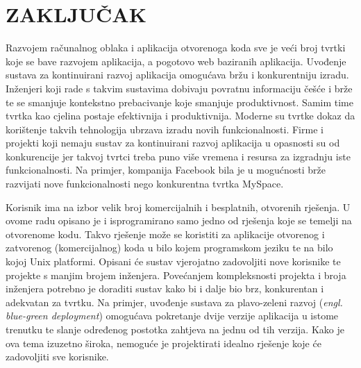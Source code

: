 \chapter{ZAKLJUČAK}
Razvojem računalnog oblaka i aplikacija otvorenoga koda sve je veći broj tvrtki koje se bave razvojem
aplikacija, a pogotovo web baziranih aplikacija. Uvođenje sustava za kontinuirani razvoj aplikacija
omogućava bržu i konkurentniju izradu. Inženjeri koji rade s takvim sustavima dobivaju povratnu
informaciju češće i brže te se smanjuje kontekstno prebacivanje koje smanjuje produktivnost. Samim
time tvrtka kao cjelina postaje efektivnija i produktivnija. Moderne su tvrtke dokaz da korištenje
takvih tehnologija ubrzava izradu novih funkcionalnosti. Firme i projekti koji nemaju sustav za
kontinuirani razvoj aplikacija u opasnosti su od konkurencije jer takvoj tvrtci treba puno više
vremena i resursa za izgradnju iste funkcionalnosti. Na primjer, kompanija Facebook bila je u mogućnosti
brže razvijati nove funkcionalnosti nego konkurentna tvrtka MySpace.

Korisnik ima na izbor velik broj komercijalnih i besplatnih, otvorenih rješenja. U ovome radu
opisano je i isprogramirano samo jedno od rješenja koje se temelji na otvorenome kodu. Takvo
rješenje može se koristiti za aplikacije otvorenog i zatvorenog (komercijalnog) koda u bilo kojem
programskom jeziku te na bilo kojoj Unix platformi. Opisani će sustav vjerojatno zadovoljiti nove
korisnike te projekte s manjim brojem inženjera. Povećanjem kompleksnosti projekta i broja
inženjera potrebno je doraditi sustav kako bi i dalje bio brz, konkurentan i adekvatan za tvrtku. Na
primjer, uvođenje sustava za plavo-zeleni razvoj (\textit{engl. blue-green deployment}) omogućava
pokretanje dvije verzije aplikacija u istome trenutku te slanje određenog postotka zahtjeva na jednu
od tih verzija.  Kako je ova tema izuzetno široka, nemoguće je projektirati idealno rješenje koje
će zadovoljiti sve korisnike.


